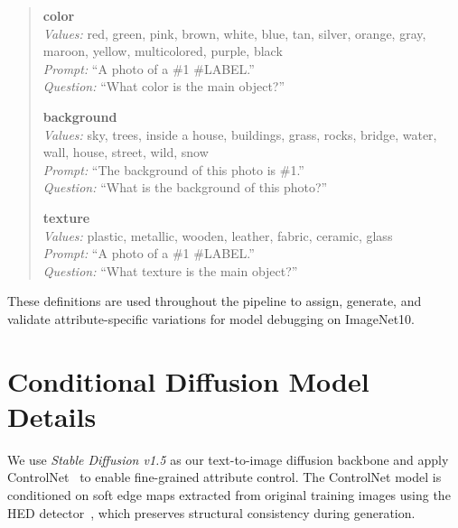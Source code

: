 \documentclass[10pt]{article} %
\newcommand{\controlnet}{ControlNet\xspace}
\begin{document}
\begin{quote}
\textbf{color} \\
\hspace*{1em} \textit{Values:} red, green, pink, brown, white, blue, tan, silver, orange, gray, maroon, \hspace*{1em} yellow, multicolored, purple, black \\
\hspace*{1em} \textit{Prompt:} ``A photo of a \#1 \#LABEL.'' \\
\hspace*{1em} \textit{Question:} ``What color is the main object?''

\textbf{background} \\
\hspace*{1em} \textit{Values:} sky, trees, inside a house, buildings, grass, rocks, bridge, water, wall, \hspace*{1em} house, street, wild, snow \\
\hspace*{1em} \textit{Prompt:} ``The background of this photo is \#1.'' \\
\hspace*{1em} \textit{Question:} ``What is the background of this photo?''

\textbf{texture} \\
\hspace*{1em} \textit{Values:} plastic, metallic, wooden, leather, fabric, ceramic, glass \\
\hspace*{1em} \textit{Prompt:} ``A photo of a \#1 \#LABEL.'' \\
\hspace*{1em} \textit{Question:} ``What texture is the main object?''
\end{quote}

These definitions are used throughout the pipeline to assign, generate, and validate attribute-specific variations for model debugging on ImageNet10.

\section{Conditional Diffusion Model Details}
\label{appendix:cdm}

We use \textit{Stable Diffusion v1.5} as our text-to-image diffusion backbone and apply \controlnet~\citep{zhang2023adding} to enable fine-grained attribute control. The ControlNet model is conditioned on soft edge maps extracted from original training images using the HED detector~\citep{xie2015holistically}, which preserves structural consistency during generation. 
\end{document}

